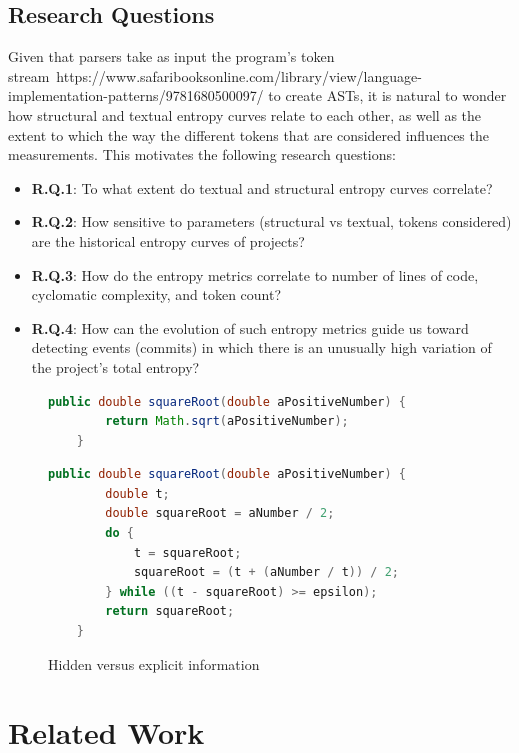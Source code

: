 \documentclass[10pt,conference]{IEEEtran}
\begin{document}
\subsection{Research Questions}
Given that parsers take as input the program's token stream~https://www.safaribooksonline.com/library/view/language-implementation-patterns/9781680500097/ to create ASTs, it is natural to wonder how structural and textual entropy curves relate to each other, as well as the extent to which the way the different tokens that are considered influences the measurements. This motivates the following research questions:

\begin{itemize}
    \item \textbf{R.Q.1}: To what extent do textual and structural entropy curves correlate?
    \item \textbf{R.Q.2}: How sensitive to parameters (structural vs textual, tokens considered) are the historical entropy curves of projects?
    \item \textbf{R.Q.3}: How do the entropy metrics correlate to number of lines of code, cyclomatic complexity, and token count?
    \item \textbf{R.Q.4}: How can the evolution of such entropy metrics guide us toward detecting events (commits) in which there is an unusually high variation of the project's total entropy?
\end{itemize}

\begin{figure}
  \begin{lstlisting}[language=Java,numbers=none]
    public double squareRoot(double aPositiveNumber) {
        return Math.sqrt(aPositiveNumber);
    }
  \end{lstlisting}
  \begin{lstlisting}[language=Java, numbers=none]
    public double squareRoot(double aPositiveNumber) {
        double t;
        double squareRoot = aNumber / 2;
        do {
            t = squareRoot;
            squareRoot = (t + (aNumber / t)) / 2;
        } while ((t - squareRoot) >= epsilon);
        return squareRoot;
    }
  \end{lstlisting}
  \caption{Hidden versus explicit information}
  \label{intro-snippet}
\end{figure}

\section{Related Work} \label{literature_review}
\end{document}
